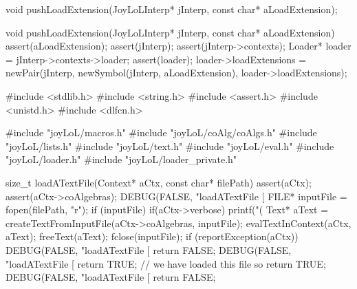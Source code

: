 \startCHeader
void pushLoadExtension(JoyLoLInterp* jInterp, const char* aLoadExtension);
\stopCHeader

\startCCode
void pushLoadExtension(JoyLoLInterp* jInterp, const char* aLoadExtension) {
  assert(aLoadExtension);
  assert(jInterp);
  assert(jInterp->contexts);
  Loader* loader = jInterp->contexts->loader;
  assert(loader);
  loader->loadExtensions =
    newPair(jInterp, newSymbol(jInterp, aLoadExtension), loader->loadExtensions);
}
\stopCCode

\starttyping
#include <stdlib.h>
#include <string.h>
#include <assert.h>
#include <unistd.h>
#include <dlfcn.h>

#include "joyLoL/macros.h"
#include "joyLoL/coAlg/coAlgs.h"
#include "joyLoL/lists.h"
#include "joyLoL/text.h"
#include "joyLoL/eval.h"
#include "joyLoL/loader.h"
#include "joyLoL/loader_private.h"

size_t loadATextFile(Context* aCtx, const char* filePath) {
  assert(aCtx);
  assert(aCtx->coAlgebras);
  DEBUG(FALSE, "loadATextFile [%
  FILE* inputFile = fopen(filePath, "r");
  if (inputFile) {
    if(aCtx->verbose) printf("(%
    Text* aText = createTextFromInputFile(aCtx->coAlgebras, inputFile);
    evalTextInContext(aCtx, aText);
    freeText(aText);
    fclose(inputFile);
    if (reportException(aCtx)) {
      DEBUG(FALSE, "loadATextFile [%
      return FALSE;
    }
    DEBUG(FALSE, "loadATextFile [%
    return TRUE; // we have loaded this file so return TRUE;
  }
  DEBUG(FALSE, "loadATextFile [%
  return FALSE;
}

